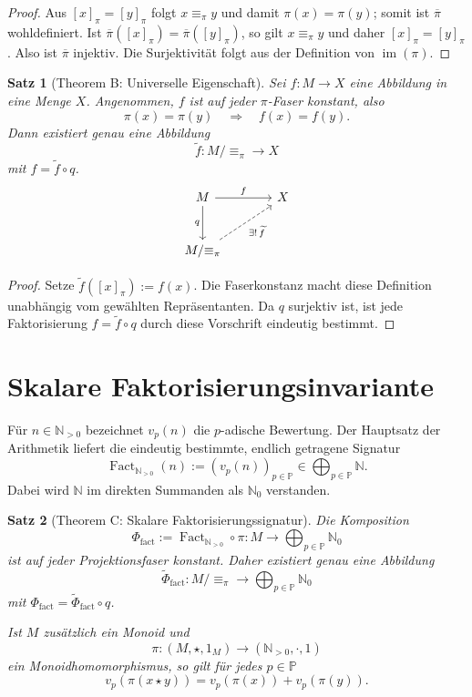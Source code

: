 \documentclass[11pt,a4paper,reqno]{amsart}
\newtheorem{theorem}{Satz}[section]
\theoremstyle{definition}
\theoremstyle{remark}
\newcommand{\N}{\mathbb{N}}
\newcommand{\Npos}{\mathbb{N}_{>0}}
\newcommand{\Pset}{\mathbb{P}}
\newcommand{\Fact}{\operatorname{Fact}}
\newcommand{\im}{\operatorname{im}}
\newcommand{\eqpi}{\mathrel{\equiv_{\pi}}}
\begin{document}
\begin{proof}
Aus $[x]_\pi=[y]_\pi$ folgt $x\eqpi y$ und damit $\pi(x)=\pi(y)$; somit ist $\overline\pi$ wohldefiniert. Ist $\overline\pi([x]_\pi)=\overline\pi([y]_\pi)$, so gilt $x\eqpi y$ und daher $[x]_\pi=[y]_\pi$. Also ist $\overline\pi$ injektiv. Die Surjektivität folgt aus der Definition von $\im(\pi)$.
\end{proof}

\begin{theorem}[Theorem B: Universelle Eigenschaft]
\label{thm:universal}
Sei $f\colon M\to X$ eine Abbildung in eine Menge $X$. Angenommen, $f$ ist auf jeder $\pi$-Faser konstant, also
\[
  \pi(x)=\pi(y)\quad\Longrightarrow\quad f(x)=f(y).
\]
Dann existiert genau eine Abbildung
\[
  \widetilde f\colon M/{\equiv_\pi}\longrightarrow X
\]
mit $f=\widetilde f\circ q$.
\[
\begin{tikzcd}[column sep=large,row sep=large]
M \arrow[r,"f"] \arrow[d,"q"'] & X\\
M/{\equiv_\pi} \arrow[ur,dashed,"\exists!\,\widetilde f"'] &
\end{tikzcd}
\]
\end{theorem}

\begin{proof}
Setze $\widetilde f([x]_\pi):=f(x)$. Die Faserkonstanz macht diese Definition unabhängig vom gewählten Repräsentanten. Da $q$ surjektiv ist, ist jede Faktorisierung $f=\widetilde f\circ q$ durch diese Vorschrift eindeutig bestimmt.
\end{proof}

\section{Skalare Faktorisierungsinvariante}

Für $n\in\Npos$ bezeichnet $v_p(n)$ die $p$-adische Bewertung. Der Hauptsatz der Arithmetik liefert die eindeutig bestimmte, endlich getragene Signatur
\[
  \Fact_{\Npos}(n):=(v_p(n))_{p\in\Pset}
  \in\bigoplus_{p\in\Pset}\N.
\]
Dabei wird $\N$ im direkten Summanden als $\mathbb N_0$ verstanden.

\begin{theorem}[Theorem C: Skalare Faktorisierungssignatur]
\label{thm:factor-signature}
Die Komposition
\[
  \Phi_{\mathrm{fact}}
  :=\Fact_{\Npos}\circ\pi
  \colon M\longrightarrow\bigoplus_{p\in\Pset}\mathbb N_0
\]
ist auf jeder Projektionsfaser konstant. Daher existiert genau eine Abbildung
\[
  \widetilde\Phi_{\mathrm{fact}}
  \colon M/{\equiv_\pi}\longrightarrow
  \bigoplus_{p\in\Pset}\mathbb N_0
\]
mit $\Phi_{\mathrm{fact}}=\widetilde\Phi_{\mathrm{fact}}\circ q$.

Ist $M$ zusätzlich ein Monoid und
\[
  \pi\colon(M,\star,1_M)\longrightarrow(\Npos,\cdot,1)
\]
ein Monoidhomomorphismus, so gilt für jedes $p\in\Pset$
\[
  v_p\!\left(\pi(x\star y)\right)
  =v_p(\pi(x))+v_p(\pi(y)).
\]
\end{theorem}
\end{document}
